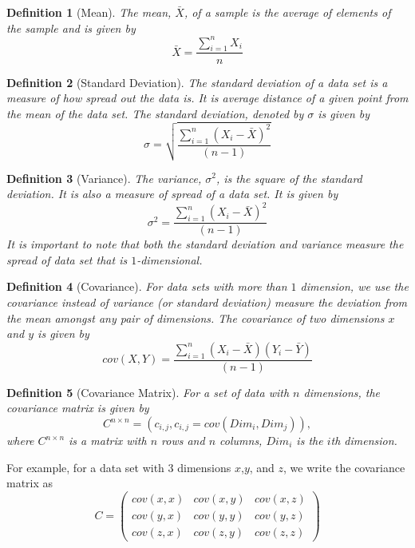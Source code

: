 \documentclass[10pt,a4paper]{article}
\newtheorem{defn}{Definition}
\begin{document}
	  \begin{defn}[Mean]
	  	The mean, $\bar{X}$, of a sample is the average of elements of the sample and is given by
	  	\begin{equation}
	  	\bar{X} = \frac{\sum_{i=1}^{n} X_i}{n}
	  	\end{equation}
	  \end{defn}
    
      \begin{defn}[Standard Deviation]
      	The standard deviation of a data set is a measure of how spread out the data is. It is average distance of a given point from the mean of the data set. The standard deviation, denoted by $\sigma$ is given by
      	\begin{equation}
      	\sigma = \sqrt{\frac{\sum_{i=1}^{n} (X_i - \bar{X})^2}{(n-1)}}
      	\end{equation}
      \end{defn}
  
      \begin{defn}[Variance]
      	The variance, $\sigma^2$, is the square of the standard deviation. It is also a measure of spread of a data set. It is given by
      	\begin{equation}
      	\sigma^2 =  \frac{\sum_{i=1}^{n} (X_i - \bar{X})^2}{(n-1)}
      	\end{equation}
      	It is important to note that both the standard deviation and variance measure the spread of data set that is $1$-dimensional. 
      \end{defn}
  
      \begin{defn}[Covariance]
      	For data sets with more than $1$ dimension, we use the covariance instead of variance (or standard deviation) measure the deviation from the mean amongst any pair of dimensions. The covariance of two dimensions $x$ and $y$ is given by
      	\begin{equation}
      	cov(X,Y) = \frac{\sum_{i=1}^{n} (X_i - \bar{X}) (Y_i - \bar{Y})}{(n-1)}
      	\end{equation}
      \end{defn}
  
       \begin{defn}[Covariance Matrix]
       	For a set of data with $n$ dimensions, the covariance matrix is given by
       	\begin{equation}
       	C^{n \times n} = (c_{i,j}, c_{i,j} = cov(Dim_i, Dim_j)),
       	\end{equation}
       	where $C^{n \times n}$ is a matrix with $n$ rows and $n$ columns, $Dim_i$ is the $i$th dimension. 
       \end{defn}
       For example, for a data set with $3$ dimensions $x$,$y$, and $z$, we write the covariance matrix as
       \begin{equation}
       C = \begin{pmatrix}
       cov(x,x) & cov(x,y) & cov(x,z) \\
       cov(y,x) & cov(y,y) & cov(y,z) \\
       cov(z,x) & cov(z,y) & cov(z,z)
       \end{pmatrix}
       \end{equation}
       
\end{document}
